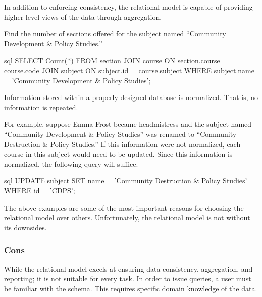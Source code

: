 			In addition to enforcing consistency, the relational model is capable of providing higher-level views of the data through aggregation.
			
			\begin{ex}[Aggregation]
				Find the number of sections offered for the subject named ``Community Development \& Policy Studies.''
				
				\begin{singlespaced}
					\begin{pygments}{sql}
SELECT Count(*)
FROM   section
       JOIN course
         ON section.course = course.code
       JOIN subject
         ON subject.id = course.subject
WHERE  subject.name = 'Community Development & Policy Studies';
					\end{pygments}
				\end{singlespaced}
			\end{ex}
			
			Information stored within a properly designed database is normalized.  That is, no information is repeated.
			
			\begin{ex}[Normalization]
				For example, suppose Emma Frost became headmistress and the subject named ``Community Development \& Policy Studies'' was renamed to ``Community Destruction \& Policy Studies.''  If this information were not normalized, each course in this subject would need to be updated.  Since this information is normalized, the following query will suffice.
				
				\begin{singlespaced}
					\begin{pygments}{sql}
UPDATE subject
SET    name = 'Community Destruction & Policy Studies'
WHERE  id = 'CDPS';
					\end{pygments}
				\end{singlespaced}
			\end{ex}
			
			The above examples are some of the most important reasons for choosing the relational model over others.	Unfortunately, the relational model is not without its downsides.
		
		\subsubsection{Cons}
			While the relational model excels at ensuring data consistency, aggregation, and reporting; it is not suitable for every task.	In order to issue queries, a user must be familiar with the schema.	 This requires specific domain knowledge of the data.
			
